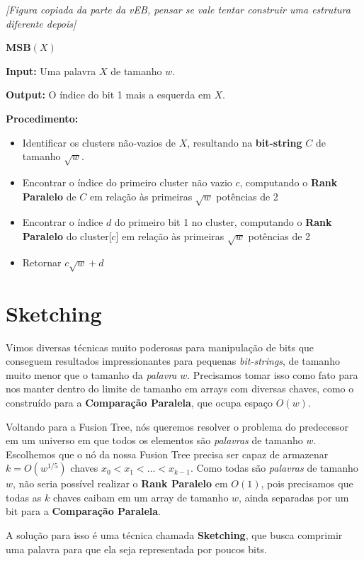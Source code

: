 \textit{[Figura copiada da parte da vEB, pensar se vale tentar construir uma estrutura diferente depois]}

\textbf{MSB}$(X)$

\textbf{Input:} Uma palavra $X$ de tamanho $w$.

\textbf{Output:} O índice do bit 1 mais a esquerda em $X$.

\textbf{Procedimento:}

\begin{itemize}
    \item Identificar os clusters não-vazios de $X$, resultando na
    \textbf{bit-string} $C$ de tamanho $\sqrt{w}$.
    \item Encontrar o índice do primeiro cluster não vazio $c$, computando o
    \textbf{Rank Paralelo} de $C$ em relação às primeiras $\sqrt{w}$ potências
    de 2
    \item Encontrar o índice $d$ do primeiro bit 1 no cluster, computando o
    \textbf{Rank Paralelo} do cluster[$c$] em relação às primeiras $\sqrt{w}$
    potências de 2
    \item Retornar $c\sqrt{w}+d$
\end{itemize}

\section{Sketching}

Vimos diversas técnicas muito poderosas para manipulação de bits que conseguem
resultados impressionantes para pequenas \textit{bit-strings}, de tamanho muito
menor que o tamanho da \textit{palavra} $w$. Precisamos tomar isso como fato
para nos manter dentro do limite de tamanho em arrays com diversas chaves, como
o construído para a \textbf{Comparação Paralela}, que ocupa espaço $O(w)$. 

Voltando para a Fusion Tree, nós queremos resolver o problema do predecessor em
um universo em que todos os elementos são \textit{palavras} de tamanho $w$.
Escolhemos que o nó da nossa Fusion Tree precisa ser capaz de armazenar
$k=O(w^{1/5})$ chaves $x_0<x_1<\dots<x_{k-1}$. Como todas são \textit{palavras}
de tamanho $w$, não seria possível realizar o \textbf{Rank Paralelo} em $O(1)$,
pois precisamos que todas as $k$ chaves caibam em um array de tamanho $w$, ainda
separadas por um bit para a \textbf{Comparação Paralela}.

A solução para isso é uma técnica chamada \textbf{Sketching}, que busca
comprimir uma palavra para que ela seja representada por poucos bits.

